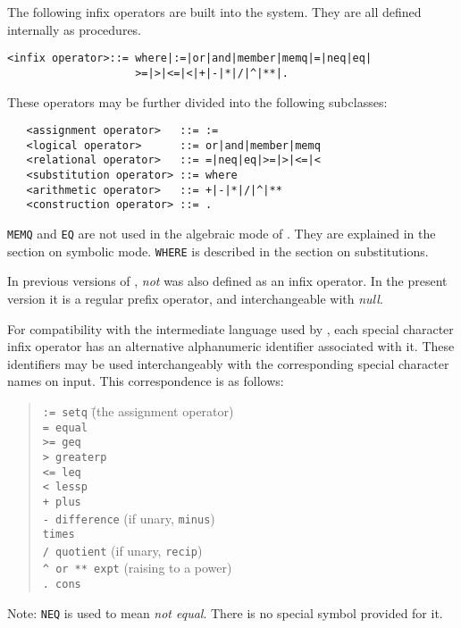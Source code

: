 The following infix operators are built into the
system.  They are all defined internally as procedures.
\begin{verbatim}
<infix operator>::= where|:=|or|and|member|memq|=|neq|eq|
                    >=|>|<=|<|+|-|*|/|^|**|.
\end{verbatim}
These operators may be further divided into the following subclasses:
\begin{verbatim}
   <assignment operator>   ::= :=
   <logical operator>      ::= or|and|member|memq
   <relational operator>   ::= =|neq|eq|>=|>|<=|<
   <substitution operator> ::= where
   <arithmetic operator>   ::= +|-|*|/|^|**
   <construction operator> ::= .
\end{verbatim}
{\tt MEMQ} and {\tt EQ} are not used in the algebraic mode of
{\REDUCE}.  They are explained in the section on symbolic mode.
{\tt WHERE} is described in the section on substitutions.

In previous versions of {\REDUCE}, {\em not} was also defined as an infix
operator.  In the present version it is a regular prefix operator, and
interchangeable with {\em null}.

For compatibility with the intermediate language used by {\REDUCE}, each
special character infix operator has an alternative
alphanumeric identifier associated with it.  These identifiers may be used
interchangeably with the corresponding special character names on input.
This correspondence is as follows:
\begin{quote}
\begin{tabbing}
{\tt :=      setq} \hspace{0.5in} \= (the assignment operator) \\
{\tt =       equal} \\
{\tt >=      geq} \\
{\tt >       greaterp} \\
{\tt <=      leq} \\
{\tt <       lessp} \\
{\tt +       plus} \\
{\tt -       difference} \> (if unary, {\tt minus}) \\
{\tt *       times} \\
{\tt /       quotient} \> (if unary, {\tt recip}) \\
{\tt \verb|^| or ** expt} \> (raising to a power) \\
{\tt .       cons}
\end{tabbing}
\end{quote}
Note: {\tt NEQ} is used to mean {\em not equal}.  There is no special
symbol provided for it.

